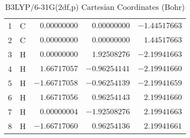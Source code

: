 \documentclass[10pt,oneside]{article}
\begin{document}
\begin{table}[h!]
\centering
\caption{B3LYP/6-31G(2df,p) Cartesian Coordinates (Bohr)}
\begin{tabular}{llrrr}
1  & C  & $ 0.00000000$ & $ 0.00000000$ & $-1.44517663$ \\
2  & C  & $ 0.00000000$ & $ 0.00000000$ & $ 1.44517663$ \\
3  & H  & $ 0.00000000$ & $ 1.92508276$ & $-2.19941663$ \\
4  & H  & $ 1.66717057$ & $-0.96254141$ & $-2.19941660$ \\
5  & H  & $-1.66717058$ & $-0.96254139$ & $-2.19941659$ \\
6  & H  & $ 1.66717056$ & $ 0.96254143$ & $ 2.19941660$ \\
7  & H  & $ 0.00000004$ & $-1.92508276$ & $ 2.19941663$ \\
8  & H  & $-1.66717060$ & $ 0.96254136$ & $ 2.19941661$ \\
\end{tabular}
\end{table}

\clearpage
\end{document}
